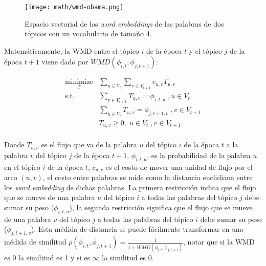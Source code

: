 \documentclass[letterpaper,12pt,oneside]{book} %
\begin{document}
\begin{figure}
    \centering
\texttt{[image: math/wmd-obama.png]}
    \caption{Espacio vectorial de los \textit{word embeddings} de las palabras de dos tópicos con un vocabulario de tamaño 4.}
    \label{img:wmd_obama}
\end{figure}

Matemáticamente, la WMD entre el tópico $i$ de la época $t$ y el tópico $j$ de la época $t+1$ viene dado por $WMD(\phi_{i,t}, \phi_{j,t+1})$:

\begin{align}
\underset{T}{\text{minimize}}&\sum_{u \in V_{t}}\sum_{v \in V_{t+1}} c_{u,v}T_{u,v} \\ 
\textrm{s.t.}\qquad &\sum_{v \in V_{t+1}}T_{u,v}= \phi_{i,t,u} \;, u \in V_{t}\\ 
& \sum_{u \in V_{t}}T_{u,v}= \phi_{j,t+1,v} \;, v\in V_{t+1}\\
& T_{u,v} \geq 0,\; u \in V_{t} \;, v \in V_{t+1}\\ \nonumber
\end{align}

Donde $T_{u,v}$ es el flujo que va de la palabra $u$ del tópico $i$ de la época $t$ a la palabra $v$ del tópico $j$ de la época $t+1$, $\phi_{i,t,u}$, es la probabilidad de la palabra $u$ en el tópico $i$ de la época $t$, $c_{u,v}$ es el costo de mover una unidad de flujo por el arco $(u,v)$, el costo entre palabras se mide como la distancia euclidiana entre los \textit{word embedding} de dichas palabras. La primera restricción indica que el flujo que se mueve de una palabra $u$ del tópico $i$ a todas las palabras del tópico $j$ debe sumar su peso ($\phi_{i,t,u}$), la segunda restricción significa que el flujo que se mueve de una palabra $v$ del tópico $j$ a todas las palabras del tópico $i$ debe sumar su peso ($\phi_{j,t+1,v}$). Esta médida de distancia se puede fácilmente transformar en una médida de similitud $\rho(\phi_{i,t}, \phi_{j,t+1}) = \frac{1}{1+WMD(\phi_{i,t}, \phi_{j,t+1})}$, notar que si la WMD es 0 la similitud es 1 y si es $\infty$ la similitud es 0. \\
\end{document}
